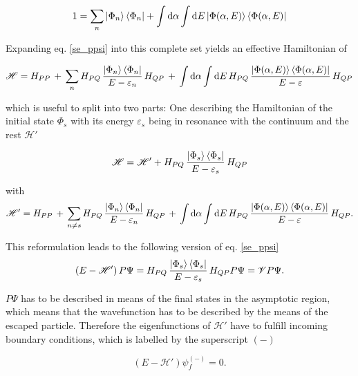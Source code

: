 \begin{equation}
  1 = \sum\limits_n \ket{\Phi_n}\bra{\Phi_n} + \int \mathrm{d}\alpha \int \mathrm{d}E
      \ket{\Phi(\alpha,E)}\bra{\Phi(\alpha,E)} \label{feshbach_1}
\end{equation}

Expanding eq. \ref{se_ppsi} into this complete set yields an effective Hamiltonian
of

\begin{equation}
  \mathscr{H} = H_{PP}\, + \,
  \sum\limits_n H_{PQ} \,\frac{\ket{\Phi_n}\bra{\Phi_n}}{E-\varepsilon_n}\, H_{QP} \,+\,
  \int \mathrm{d}\alpha \int\mathrm{d}E \,H_{PQ} \,
  \frac{\ket{\Phi(\alpha,E)}\bra{\Phi(\alpha,E)}}{E-\varepsilon} \, H_{QP}
\end{equation}

which is useful to split into two parts: One describing the Hamiltonian of the
initial state $\Phi_s$ with its energy $\varepsilon_s$ being in resonance with
the continuum and the rest
$\mathscr{H}'$

\begin{equation}
  \mathscr{H} = \mathscr{H}' + H_{PQ} \,\frac{\ket{\Phi_s}\bra{\Phi_s}}{E-\varepsilon_s}\, H_{QP}
\end{equation}

with
\begin{equation}
  \mathscr{H}' = H_{PP}\, + \,
  \sum\limits_{n\ne s} H_{PQ} \,\frac{\ket{\Phi_n}\bra{\Phi_n}}{E-\varepsilon_n}
  \, H_{QP} \,+\,
  \int \mathrm{d}\alpha \int\mathrm{d}E \,H_{PQ} \,
  \frac{\ket{\Phi(\alpha,E)}\bra{\Phi(\alpha,E)}}{E-\varepsilon} \, H_{QP} .
\end{equation}

This reformulation leads to the following version of eq. \ref{se_ppsi}
\begin{equation}
  (E - \mathscr{H}')\, P \Psi =
   H_{PQ} \,\frac{\ket{\Phi_s}\bra{\Phi_s}}{E-\varepsilon_s}\, H_{QP} P \Psi = \mathscr{V} P \Psi.
\end{equation}

$P \Psi$ has to be described in means of the final states in the asymptotic
region, which means that the wavefunction has to be described by the means
of the escaped particle. Therefore
the eigenfunctions of $\mathscr{H}'$ have to fulfill incoming boundary conditions,
which is labelled by the superscript $(-)$

\begin{equation}
  (E-\mathscr{H}') \psi_f^{(-)} = 0 \label{sol_outg} .
\end{equation}

